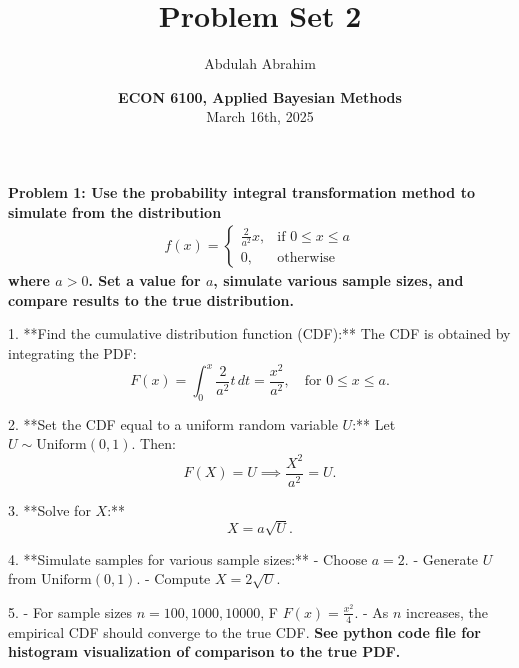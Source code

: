 \documentclass[12pt]{article}
\title{Problem Set 2} %
\date{\textbf{ECON 6100, Applied Bayesian Methods} \\ March 16th, 2025} %
\author{Abdulah Abrahim} %
\begin{document}
\maketitle

\pagestyle{myheadings} %

\pagebreak

\begin{homeworkProblem}
\textbf{Problem 1: Use the probability integral transformation method to simulate from the distribution}
\textbf{\begin{gather}
    f(x) = 
    \begin{cases}
        \frac{2}{a^2}x,  & \text{if }0\leq x\leq a \\
        0, & \text{otherwise}
    \end{cases}
\end{gather}
where \( a > 0 \). Set a value for \( a \), simulate various sample sizes, and compare results to the true distribution.}

\begin{solution}

1. **Find the cumulative distribution function (CDF):**
   The CDF is obtained by integrating the PDF:
   \[
   F(x) = \int_{0}^{x} \frac{2}{a^2} t \, dt = \frac{x^2}{a^2}, \quad \text{for } 0 \leq x \leq a.
   \]

2. **Set the CDF equal to a uniform random variable \( U \):**
   Let \( U \sim \text{Uniform}(0,1) \). Then:
   \[
   F(X) = U \implies \frac{X^2}{a^2} = U.
   \]

3. **Solve for \( X \):**
   \[
   X = a \sqrt{U}.
   \]

4. **Simulate samples for various sample sizes:**
   - Choose \( a = 2 \).
   - Generate \( U \) from \( \text{Uniform}(0,1) \).
   - Compute \( X = 2 \sqrt{U} \).

5. 
   - For sample sizes \( n = 100, 1000, 10000 \), F \( F(x) = \frac{x^2}{4} \).
   - As \( n \) increases, the empirical CDF should converge to the true CDF. \textbf{See python code file for histogram visualization of comparison to the true PDF. }
\end{solution}
\end{homeworkProblem}

\pagebreak
\end{document}
